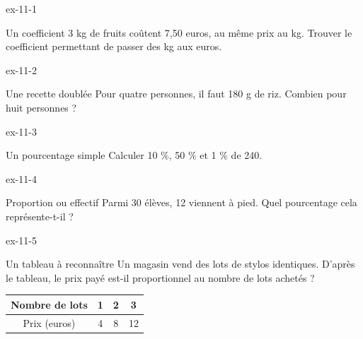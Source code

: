 \clearpage{}
\begin{blocLivre}{ex-11-1}\begin{exercice}[1]{Un coefficient}
3 kg de fruits coûtent 7,50 euros, au même prix au kg. Trouver le coefficient permettant de passer des kg aux euros.
\end{exercice}\end{blocLivre}
\begin{blocLivre}{ex-11-2}\begin{exercice}[1]{Une recette doublée}
Pour quatre personnes, il faut 180 g de riz. Combien pour huit personnes ?
\end{exercice}\end{blocLivre}
\begin{blocLivre}{ex-11-3}\begin{exercice}[1]{Un pourcentage simple}
Calculer 10 \%, 50 \% et 1 \% de 240.
\end{exercice}\end{blocLivre}
\begin{blocLivre}{ex-11-4}\begin{exercice}[1]{Proportion ou effectif}
Parmi 30 élèves, 12 viennent à pied. Quel pourcentage cela représente-t-il ?
\end{exercice}\end{blocLivre}
\begin{blocLivre}{ex-11-5}\begin{exercice}[1]{Un tableau à reconnaître}
Un magasin vend des lots de stylos identiques. D’après le tableau, le prix payé est-il proportionnel au nombre de lots achetés ?\begin{center}\renewcommand{\arraystretch}{1.35}\begin{tabular}{c|ccc}\toprule
Nombre de lots & 1 & 2 & 3\\\midrule
Prix (euros) & 4 & 8 & 12\\
\bottomrule\end{tabular}\end{center}
\end{exercice}\end{blocLivre}

